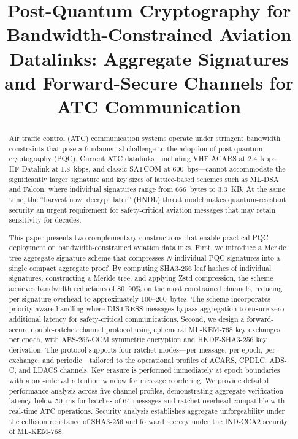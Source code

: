 \documentclass[conference,10pt]{IEEEtran}
\begin{document}
\title{Post-Quantum Cryptography for Bandwidth-Constrained Aviation Datalinks: Aggregate Signatures and Forward-Secure Channels for ATC Communication}

\author{
}

\maketitle

\begin{abstract}
Air traffic control (ATC) communication systems operate under stringent bandwidth constraints that pose a fundamental challenge to the adoption of post-quantum cryptography (PQC). Current ATC datalinks---including VHF ACARS at 2.4~kbps, HF Datalink at 1.8~kbps, and classic SATCOM at 600~bps---cannot accommodate the significantly larger signature and key sizes of lattice-based schemes such as ML-DSA and Falcon, where individual signatures range from 666~bytes to 3.3~KB. At the same time, the ``harvest now, decrypt later'' (HNDL) threat model makes quantum-resistant security an urgent requirement for safety-critical aviation messages that may retain sensitivity for decades.

This paper presents two complementary constructions that enable practical PQC deployment on bandwidth-constrained aviation datalinks. First, we introduce a Merkle tree aggregate signature scheme that compresses $N$ individual PQC signatures into a single compact aggregate proof. By computing SHA3-256 leaf hashes of individual signatures, constructing a Merkle tree, and applying Zstd compression, the scheme achieves bandwidth reductions of 80--90\% on the most constrained channels, reducing per-signature overhead to approximately 100--200~bytes. The scheme incorporates priority-aware handling where DISTRESS messages bypass aggregation to ensure zero additional latency for safety-critical communications. Second, we design a forward-secure double-ratchet channel protocol using ephemeral ML-KEM-768 key exchanges per epoch, with AES-256-GCM symmetric encryption and HKDF-SHA3-256 key derivation. The protocol supports four ratchet modes---per-message, per-epoch, per-exchange, and periodic---tailored to the operational profiles of ACARS, CPDLC, ADS-C, and LDACS channels. Key erasure is performed immediately at epoch boundaries with a one-interval retention window for message reordering. We provide detailed performance analysis across five channel profiles, demonstrating aggregate verification latency below 50~ms for batches of 64 messages and ratchet overhead compatible with real-time ATC operations. Security analysis establishes aggregate unforgeability under the collision resistance of SHA3-256 and forward secrecy under the IND-CCA2 security of ML-KEM-768.
\end{abstract}
\end{document}
